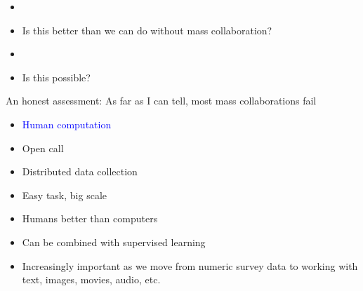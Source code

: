 \documentclass[aspectratio=169]{beamer}
\begin{document}
\begin{frame}

\begin{itemize}
  \item {} 
  \item<2-> Is this better than we can do without mass collaboration?
\end{itemize}

\end{frame}
\begin{frame}

\begin{itemize}
  \item {} 
  \item<2-> Is this possible?
\end{itemize}

\end{frame}
\begin{frame}

An honest assessment: \pause As far as I can tell, most mass collaborations fail

\end{frame}
\begin{frame}

\begin{itemize}
\item \textcolor{blue}{Human computation}
\item Open call
\item Distributed data collection
\end{itemize}

\end{frame}
\begin{frame}

\begin{itemize}
\item Easy task, big scale
\pause
\item Humans better than computers
\pause
\item Can be combined with supervised learning 
\pause
\item Increasingly important as we move from numeric survey data to working with text, images, movies, audio, etc.
\end{itemize}

\end{frame}
\end{document}
